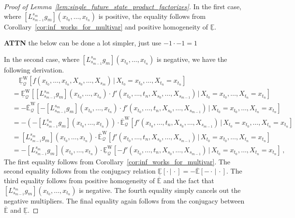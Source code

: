 \documentclass[10pt]{paper}
\theoremstyle{definition}
\newcommand{\rateset}{\mathcal{Q}}
\begin{document}
\begin{proof}[Proof of Lemma~\ref{lem:single_future_state_product_factorizes}]
In the first case, where $[L_{s_{m-1}}^{s_m}g_m](x_{t_0},\ldots,x_{t_n})$ is positive, the equality follows from Corollary~\ref{cor:inf_works_for_multivar} and positive homogeneity of $\underline{\mathbb{E}}$.

{\bf ATTN} the below can be done a lot simpler, just use $-1\cdot-1=1$

In the second case, where $[L_{s_{m-1}}^{s_m}g_m](x_{t_0},\ldots,x_{t_n})$ is negative, we have the following derivation.
\begin{align*}
&\quad \underline{\mathbb{E}}_\rateset^\mathrm{W}[f(x_{t_0},\ldots,x_{t_n},X_{s_0},\ldots,X_{s_m})\,\vert\,X_{t_0}=x_{t_0},\ldots,X_{t_n}=x_{t_n}] \\
 &= \underline{\mathbb{E}}_\rateset^\mathrm{W}\left[[L_{s_{m-1}}^{s_m}g_m](x_{t_0},\ldots,x_{t_n})\cdot f'(x_{t_0},\ldots,t_n,X_{s_0},\ldots,X_{s_{m-1}})\,\Big\vert\,X_{t_0}=x_{t_0},\ldots,X_{t_n}=x_{t_n}\right] \\
 &= -\overline{\mathbb{E}}_\rateset^\mathrm{W}\left[-[L_{s_{m-1}}^{s_m}g_m](x_{t_0},\ldots,x_{t_n})\cdot f'(x_{t_0},\ldots,t_n,X_{s_0},\ldots,X_{s_{m-1}})\,\Big\vert\,X_{t_0}=x_{t_0},\ldots,X_{t_n}=x_{t_n}\right] \\
 &= -\left(-[L_{s_{m-1}}^{s_m}g_m](x_{t_0},\ldots,x_{t_n})\right)\cdot\overline{\mathbb{E}}_\rateset^\mathrm{W}\left[ f'(x_{t_0},\ldots,t_n,X_{s_0},\ldots,X_{s_{m-1}})\,\Big\vert\,X_{t_0}=x_{t_0},\ldots,X_{t_n}=x_{t_n}\right] \\
 &= [L_{s_{m-1}}^{s_m}g_m](x_{t_0},\ldots,x_{t_n})\cdot\overline{\mathbb{E}}_\rateset^\mathrm{W}\left[ f'(x_{t_0},\ldots,t_n,X_{s_0},\ldots,X_{s_{m-1}})\,\Big\vert\,X_{t_0}=x_{t_0},\ldots,X_{t_n}=x_{t_n}\right] \\
 &= -[L_{s_{m-1}}^{s_m}g_m](x_{t_0},\ldots,x_{t_n})\cdot\underline{\mathbb{E}}_\rateset^\mathrm{W}\left[ -f'(x_{t_0},\ldots,t_n,X_{s_0},\ldots,X_{s_{m-1}})\,\Big\vert\,X_{t_0}=x_{t_0},\ldots,X_{t_n}=x_{t_n}\right] \,,
\end{align*}
The first equality follows from Corollary~\ref{cor:inf_works_for_multivar}. The second equality follows from the conjugacy relation $\underline{\mathbb{E}}[\cdot\,\vert\,\cdot]=-\overline{\mathbb{E}}[-\cdot\,\vert\,\cdot]$. The third equality follows from positive homogeneity of $\overline{\mathbb{E}}$ and the fact that $[L_{s_{m-1}}^{s_m}g_m](x_{t_0},\ldots,x_{t_n})$ is negative. The fourth equality simply cancels out the negative multipliers. The final equality again follows from the conjugacy between $\overline{\mathbb{E}}$ and $\underline{\mathbb{E}}$.
\end{proof}
\end{document}
